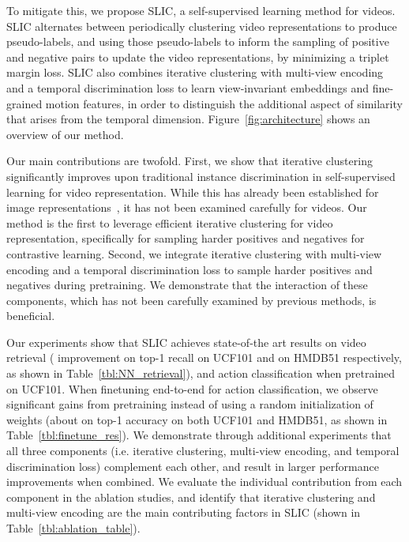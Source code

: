\documentclass[10pt,twocolumn,letterpaper]{article}
\begin{document}
To mitigate this, we propose SLIC, a self-supervised learning method for videos. SLIC alternates between periodically clustering video representations to produce pseudo-labels, and using those pseudo-labels to inform the sampling of positive and negative pairs to update the video representations, by minimizing a triplet margin loss. SLIC also combines iterative clustering with multi-view encoding and a temporal discrimination loss to learn view-invariant embeddings and fine-grained motion features, in order to distinguish the additional aspect of similarity that arises from the temporal dimension. Figure~\ref{fig:architecture} shows an overview of our method. 

Our main contributions are twofold. First, we show that iterative clustering significantly improves upon traditional instance discrimination in self-supervised learning for video representation. While this has already been established for image representations~\cite{caron2018deep, caron2019unsupervised}, it has not been examined carefully for videos. Our method is the first to leverage efficient iterative clustering for video representation, specifically for sampling harder positives and negatives for contrastive learning. Second, we integrate iterative clustering with multi-view encoding and a temporal discrimination loss to sample harder positives and negatives during pretraining. We demonstrate that the interaction of these components, which has not been carefully examined by previous methods, is beneficial.

Our experiments show that SLIC achieves state-of-the art results on video retrieval ( improvement on top-1 recall on UCF101 and  on HMDB51 respectively, as shown in Table~\ref{tbl:NN_retrieval}), and action classification when pretrained on UCF101. When finetuning end-to-end for action classification, we observe significant gains from pretraining instead of using a random initialization of weights (about  on top-1 accuracy on both UCF101 and HMDB51, as shown in Table~\ref{tbl:finetune_res}). We demonstrate through additional experiments that all three components (i.e. iterative clustering, multi-view encoding, and temporal discrimination loss) complement each other, and result in larger performance improvements when combined. We evaluate the individual contribution from each component in the ablation studies, and identify that iterative clustering and multi-view encoding are the main contributing factors in SLIC (shown in Table~\ref{tbl:ablation_table}). 
\end{document}
